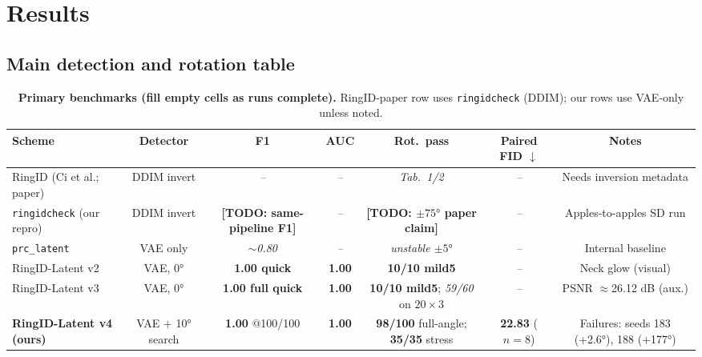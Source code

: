 \documentclass[11pt,a4paper]{article}
\newcommand{\placeholder}[1]{\textcolor{gray!70!black}{\textit{#1}}}
\newcommand{\todo}[1]{\textcolor{red!70!black}{\textbf{[TODO: #1]}}}
\newcommand{\metricgood}[1]{\textbf{\textcolor{green!40!black}{#1}}}
\begin{document}
\section{Results}

\subsection{Main detection and rotation table}

\begin{table}[t]
  \centering
  \caption{\textbf{Primary benchmarks (fill empty cells as runs complete).}
  RingID-paper row uses \texttt{ringidcheck} (DDIM); our rows use VAE-only unless noted.}
  \label{tab:main}
  \small
  \renewcommand{\arraystretch}{1.15}
  \begin{tabular}{@{}lcccccc@{}}
    \toprule
    \textbf{Scheme} & \textbf{Detector} &
    \textbf{F1} & \textbf{AUC} &
    \textbf{Rot.\ pass} & \textbf{Paired FID} $\downarrow$ &
    \textbf{Notes} \\
    \midrule
    RingID (Ci et al.; paper) & DDIM invert &
    \placeholder{--} & \placeholder{--} &
    \placeholder{Tab.~1/2} & \placeholder{--} &
    Needs inversion metadata \\
    \texttt{ringidcheck} (our repro) & DDIM invert &
    \todo{same-pipeline F1} & \placeholder{--} &
    \todo{$\pm75°$ paper claim} & \placeholder{--} &
    Apples-to-apples SD run \\
    \texttt{prc\_latent} & VAE only &
    \placeholder{$\sim$0.80} & \placeholder{--} &
    \placeholder{unstable $\pm5°$} & \placeholder{--} &
    Internal baseline \\
    RingID-Latent v2 & VAE, 0° &
    \metricgood{1.00 quick} & \metricgood{1.00} &
    \metricgood{10/10 mild5} & \placeholder{--} &
    Neck glow (visual) \\
    RingID-Latent v3 & VAE, 0° &
    \metricgood{1.00 full quick} & \metricgood{1.00} &
    \metricgood{10/10 mild5}; \placeholder{59/60} on $20{\times}3$ &
    \placeholder{--} &
    PSNR $\approx$26.12 dB (aux.) \\
    \rowcolor{orange!8}
    \textbf{RingID-Latent v4 (ours)} & VAE + 10° search &
    \metricgood{\textbf{1.00}} @100/100 &
    \metricgood{\textbf{1.00}} &
    \metricgood{\textbf{98/100}} full-angle; \textbf{35/35} stress &
    \metricgood{\textbf{22.83}} ($n{=}8$) &
    Failures: seeds 183 (+2.6°), 188 (+177°) \\
    \bottomrule
  \end{tabular}
\end{table}
\end{document}
